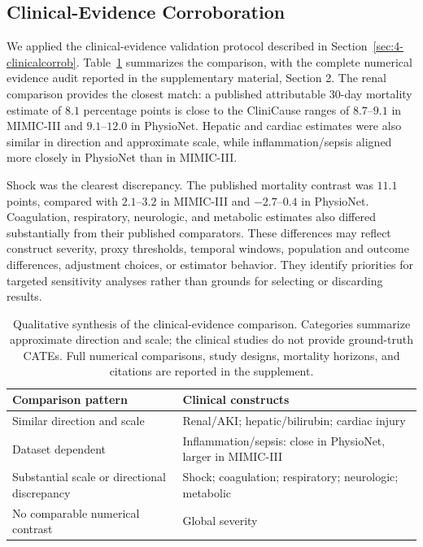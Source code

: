\documentclass[letterpaper]{article}
\begin{document}
\subsection{Clinical-Evidence Corroboration}\label{sec:ClinicalEvidenceCorrob}


We applied the clinical-evidence validation protocol described in
Section~\ref{sec:4-clinicalcorrob}. Table~\ref{tab:clinical-corroboration} summarizes the comparison, with
the complete numerical evidence audit reported in the supplementary material, Section 2. The renal comparison provides the closest match: a published attributable
30-day mortality estimate of \(8.1\) percentage points is close to the
CliniCause ranges of \(8.7\)--\(9.1\) in MIMIC-III and \(9.1\)--\(12.0\) in
PhysioNet. Hepatic and cardiac estimates were also similar in direction and
approximate scale, while inflammation/sepsis aligned more closely in PhysioNet
than in MIMIC-III.

Shock was the clearest discrepancy. The published mortality contrast was
\(11.1\) points, compared with \(2.1\)--\(3.2\) in MIMIC-III and
\(-2.7\)--\(0.4\) in PhysioNet. Coagulation, respiratory, neurologic, and
metabolic estimates also differed substantially from their published
comparators. These differences may reflect construct severity, proxy
thresholds, temporal windows, population and outcome differences, adjustment
choices, or estimator behavior. They identify priorities for targeted
sensitivity analyses rather than grounds for selecting or discarding results.



\begin{table}[t]
  \centering
  \small
  \setlength{\tabcolsep}{4pt}
  \renewcommand{\arraystretch}{1.08}
  \begin{tabular}{@{}p{}p{}@{}}
    \toprule
    Comparison pattern & Clinical constructs \\
    \midrule
    Similar direction and scale &
    Renal/AKI; hepatic/bilirubin; cardiac injury \\
        \midrule

    Dataset dependent &
    Inflammation/sepsis: close in PhysioNet, larger in MIMIC-III \\
        \midrule

    Substantial scale or directional discrepancy &
    Shock; coagulation; respiratory; neurologic; metabolic \\
        \midrule

    No comparable numerical contrast &
    Global severity \\
    \bottomrule
  \end{tabular}
  \caption{Qualitative synthesis of the clinical-evidence comparison. Categories
  summarize approximate direction and scale; the clinical studies do not
  provide ground-truth CATEs. Full numerical comparisons, study designs,
  mortality horizons, and citations are reported in the supplement.}
  \label{tab:clinical-corroboration}
\end{table}
\end{document}
